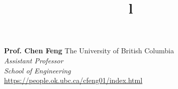 \documentclass[margin, line]{res}
\begin{document}
\begin{resume}
\textbf{Prof. Chen Feng} \hfill The University of British Columbia\\
{\sl Assistant Professor}\\
{\sl School of Engineering}\\
\url{https://people.ok.ubc.ca/cfeng01/index.html}


\begin{format}
\title{l}\\
\\
\body\\
\end{format}

\end{resume}
\(\)
\end{document}
